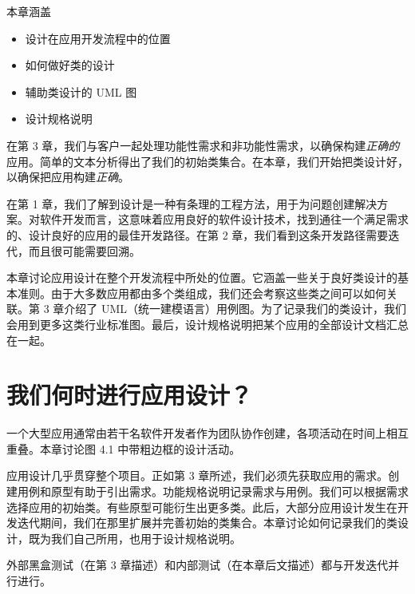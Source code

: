 \begin{myChapterIntro}{本章涵盖}
\begin{itemize}
\item 设计在应用开发流程中的位置
\item 如何做好类的设计
\item 辅助类设计的 UML 图
\item 设计规格说明
\end{itemize}
\end{myChapterIntro}

在第 3 章，我们与客户一起处理功能性需求和非功能性需求，以确保构建\emph{正确的}应用。简单的文本分析得出了我们的初始类集合。在本章，我们开始把类设计好，以确保把应用构建\emph{正确}。

在第 1 章，我们了解到设计是一种有条理的工程方法，用于为问题创建解决方案。对软件开发而言，这意味着应用良好的软件设计技术，找到通往一个满足需求的、设计良好的应用的最佳开发路径。在第 2 章，我们看到这条开发路径需要迭代，而且很可能需要回溯。


本章讨论应用设计在整个开发流程中所处的位置。它涵盖一些关于良好类设计的基本准则。由于大多数应用都由多个类组成，我们还会考察这些类之间可以如何关联。第 3 章介绍了 UML（统一建模语言）用例图。为了记录我们的类设计，我们会用到更多这类行业标准图。最后，设计规格说明把某个应用的全部设计文档汇总在一起。

\section{我们何时进行应用设计？}

一个大型应用通常由若干名软件开发者作为团队协作创建，各项活动在时间上相互重叠。本章讨论图 4.1 中带粗边框的设计活动。

应用设计几乎贯穿整个项目。正如第 3 章所述，我们必须先获取应用的需求。创建用例和原型有助于引出需求。功能规格说明记录需求与用例。我们可以根据需求选择应用的初始类。有些原型可能衍生出更多类。此后，大部分应用设计发生在开发迭代期间，我们在那里扩展并完善初始的类集合。本章讨论如何记录我们的类设计，既为我们自己所用，也用于设计规格说明。


外部黑盒测试（在第 3 章描述）和内部测试（在本章后文描述）都与开发迭代并行进行。

